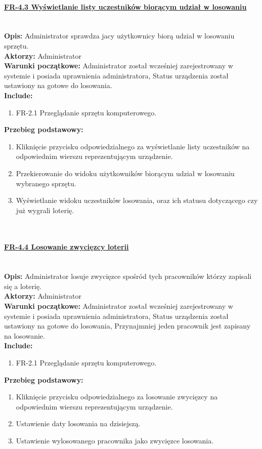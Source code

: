\paragraph{\underline{FR-4.3 Wyświetlanie listy uczestników biorącym udział w losowaniu}}\mbox{}\\[1mm]
	\noindent\textbf{Opis:} Administrator sprawdza jacy użytkownicy biorą udział w losowaniu sprzętu.\\
	\noindent\textbf{Aktorzy:} Administrator\\
	\textbf{Warunki początkowe:} Administrator został wcześniej zarejestrowany w systemie i posiada uprawnienia administratora, Status urządzenia został ustawiony na gotowe do losowania.\\
	\textbf{Include:} 
	\begin{enumerate}[noparskip]
		\item FR-2.1 Przeglądanie sprzętu komputerowego.
	\end{enumerate}
  \textbf{Przebieg podstawowy:}
	\begin{enumerate}[noparskip]
		\item Kliknięcie przycisku odpowiedzialnego za wyświetlanie listy uczestników na odpowiednim wierszu reprezentującym urządzenie.
		\item Przekierowanie do widoku użytkowników biorącym udział w losowaniu wybranego sprzętu.
		\item Wyświetlanie widoku uczestników losowania, oraz ich statusu dotyczącego czy już wygrali loterię.
  \end{enumerate} \mbox{}\\[-11mm]

\paragraph{\underline{FR-4.4 Losowanie zwycięzcy loterii}}\mbox{}\\[1mm]
	\noindent\textbf{Opis:} Administrator losuje zwycięzce spośród tych pracowników którzy zapisali się a loterię.\\
	\noindent\textbf{Aktorzy:} Administrator\\
	\textbf{Warunki początkowe:} Administrator został wcześniej zarejestrowany w systemie i posiada uprawnienia administratora, Status urządzenia został ustawiony na gotowe do losowania, Przynajmniej jeden pracownik jest zapisany na losowanie.\\
	\textbf{Include:} 
	\begin{enumerate}[noparskip]
		\item FR-2.1 Przeglądanie sprzętu komputerowego.
	\end{enumerate}
  \textbf{Przebieg podstawowy:}
	\begin{enumerate}[noparskip]
		\item Kliknięcie przycisku odpowiedzialnego za losowanie zwycięzcy na odpowiednim wierszu reprezentującym urządzenie.
		\item Ustawienie daty losowania na dzisiejszą.
		\item Ustawienie wylosowanego pracownika jako zwycięzce losowania.
  \end{enumerate} \mbox{}\\[-11mm]

